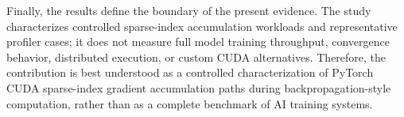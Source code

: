 Finally, the results define the boundary of the present evidence. The study characterizes controlled sparse-index accumulation workloads and representative profiler cases; it does not measure full model training throughput, convergence behavior, distributed execution, or custom CUDA alternatives. Therefore, the contribution is best understood as a controlled characterization of PyTorch CUDA sparse-index gradient accumulation paths during backpropagation-style computation, rather than as a complete benchmark of AI training systems.